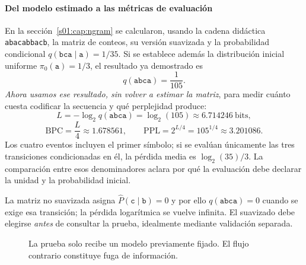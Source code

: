 \paragraph{Del modelo estimado a las métricas de evaluación}
En la sección~\ref{s01:cap:ngram} se calcularon, usando la cadena didáctica
\texttt{abacabbacb}, la matriz de conteos, su versión suavizada y la
probabilidad condicional $q(\texttt{bca}\mid\texttt{a})=1/35$.
Si se establece además la distribución inicial uniforme
$\pi_0(\texttt{a})=1/3$, el resultado ya demostrado es
\[
q(\texttt{abca})=\frac1{105}.
\]
\emph{Ahora usamos ese resultado, sin volver a estimar la matriz}, para medir
cuánto cuesta codificar la secuencia y qué perplejidad produce:
\[
L=-\log_2q(\texttt{abca})=\log_2(105)\approx6.714246\ \text{bits},
\]
\[
\mathrm{BPC}=\frac{L}{4}\approx1.678561,
\qquad \mathrm{PPL}=2^{L/4}=105^{1/4}\approx3.201086.
\]
Los cuatro eventos incluyen el primer símbolo; si se evalúan únicamente
las tres transiciones condicionadas en él, la pérdida media es
$\log_2(35)/3$. La comparación entre esos denominadores aclara por qué
la evaluación debe declarar la unidad y la probabilidad inicial.
\begin{ejemplo}
La matriz no suavizada asigna $\widehat P(\texttt{c}\mid\texttt{b})=0$ y por ello
$q(\texttt{abca})=0$ cuando se exige esa transición; la pérdida logarítmica
se vuelve infinita. El suavizado debe elegirse \emph{antes} de consultar
la prueba, idealmente mediante validación separada.
\end{ejemplo}

\begin{figure}[H]\centering
{}
\caption{La prueba solo recibe un modelo previamente fijado. El flujo contrario constituye fuga de información.}
\end{figure}



